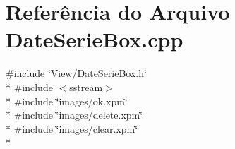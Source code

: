 \section{Referência do Arquivo Date\+Serie\+Box.\+cpp}
\label{_date_serie_box_8cpp}
{\ttfamily \#include \char`\"{}View/\+Date\+Serie\+Box.\+h\char`\"{}}\\*
{\ttfamily \#include $<$sstream$>$}\\*
{\ttfamily \#include \char`\"{}images/ok.\+xpm\char`\"{}}\\*
{\ttfamily \#include \char`\"{}images/delete.\+xpm\char`\"{}}\\*
{\ttfamily \#include \char`\"{}images/clear.\+xpm\char`\"{}}\\*
